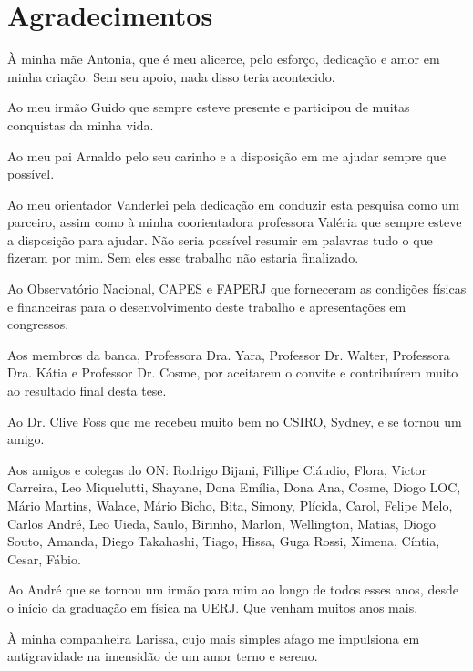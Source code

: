 \chapter*{Agradecimentos}

À minha mãe Antonia, que é meu alicerce, pelo esforço, dedicação e amor em minha criação. Sem seu apoio, nada disso teria acontecido.

Ao meu irmão Guido que sempre esteve presente e participou de muitas conquistas da minha vida.

Ao meu pai Arnaldo pelo seu carinho e a disposição em me ajudar sempre que possível.

Ao meu orientador Vanderlei pela dedicação em conduzir esta pesquisa como um parceiro, assim como à minha coorientadora professora Valéria que sempre esteve a disposição para ajudar. Não seria possível resumir em palavras tudo o que fizeram por mim. Sem eles esse trabalho não estaria finalizado.

Ao Observatório Nacional, CAPES e FAPERJ que forneceram as condições físicas e financeiras para o desenvolvimento deste trabalho e apresentações em congressos.

Aos membros da banca, Professora Dra. Yara, Professor Dr. Walter, Professora Dra. Kátia e Professor Dr. Cosme, por aceitarem o convite e contribuírem muito ao resultado final desta tese.

Ao Dr. Clive Foss que me recebeu muito bem no CSIRO, Sydney, e se tornou um amigo. 

Aos amigos e colegas do ON: Rodrigo Bijani, Fillipe Cláudio, Flora, Victor Carreira, Leo Miquelutti, Shayane, Dona Emília, Dona Ana, Cosme, Diogo LOC, Mário Martins, Walace, Mário Bicho, Bita, Simony, Plícida, Carol, Felipe Melo, Carlos André, Leo Uieda, Saulo, Birinho, Marlon, Wellington, Matias, Diogo Souto, Amanda, Diego Takahashi, Tiago, Hissa, Guga Rossi, Ximena, Cíntia, Cesar, Fábio.

Ao André que se tornou um irmão para mim ao longo de todos esses anos, desde o início da graduação em física na UERJ. Que venham muitos anos mais.

À minha companheira Larissa, cujo mais simples afago me impulsiona em antigravidade na imensidão de um amor terno e sereno.
